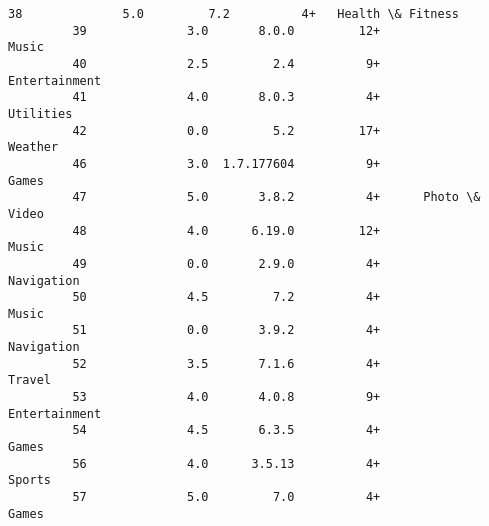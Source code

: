 \documentclass[11pt]{article}
\begin{document}
\begin{Verbatim}[commandchars=\\\{\}]
         38              5.0         7.2          4+   Health \& Fitness   
         39              3.0       8.0.0         12+              Music   
         40              2.5         2.4          9+      Entertainment   
         41              4.0       8.0.3          4+          Utilities   
         42              0.0         5.2         17+            Weather   
         46              3.0  1.7.177604          9+              Games   
         47              5.0       3.8.2          4+      Photo \& Video   
         48              4.0      6.19.0         12+              Music   
         49              0.0       2.9.0          4+         Navigation   
         50              4.5         7.2          4+              Music   
         51              0.0       3.9.2          4+         Navigation   
         52              3.5       7.1.6          4+             Travel   
         53              4.0       4.0.8          9+      Entertainment   
         54              4.5       6.3.5          4+              Games   
         56              4.0      3.5.13          4+             Sports   
         57              5.0         7.0          4+              Games   
         

\end{Verbatim}
\end{document}
